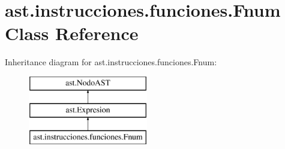 \hypertarget{classast_1_1instrucciones_1_1funciones_1_1_fnum}{}\section{ast.\+instrucciones.\+funciones.\+Fnum Class Reference}
\label{classast_1_1instrucciones_1_1funciones_1_1_fnum}
Inheritance diagram for ast.\+instrucciones.\+funciones.\+Fnum\+:\begin{figure}[H]
\begin{center}
\leavevmode
\includegraphics[height=3.000000cm]{classast_1_1instrucciones_1_1funciones_1_1_fnum}
\end{center}
\end{figure}
